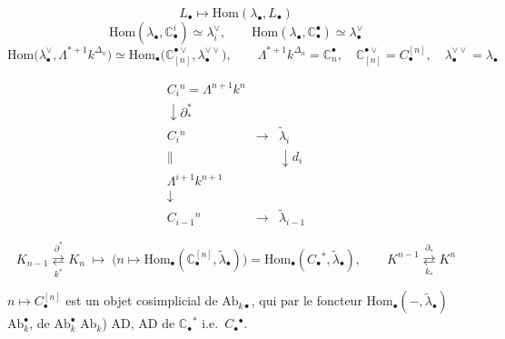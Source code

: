 \documentclass[11pt,a4paper]{article}
\begin{document}
\[
L_\bullet \longmapsto \mathrm{Hom}(\lambda_\bullet,L_\bullet)
\]
\[
\mathrm{Hom}(\lambda_\bullet,\mathbb{C}^i_\bullet) \simeq \lambda_i^\vee, \qquad
\mathrm{Hom}(\lambda_\bullet,\mathbb{C}^\bullet_\bullet) \simeq \lambda^\vee_\bullet
\]
\[
\mathrm{Hom}\bigl(\lambda^\vee_\bullet,\Lambda^{*+1}k^{\Delta_n}\bigr) \simeq \mathrm{Hom}_\bullet\bigl(\mathbb{C}^{\bullet\vee}_{[n]},\lambda^{\vee\vee}_\bullet\bigr),
\qquad \Lambda^{*+1}k^{\Delta_n} = \mathbb{C}^\bullet_n, \quad \mathbb{C}^{\bullet\vee}_{[n]} = C_\bullet^{[n]}, \quad \lambda^{\vee\vee}_\bullet = \lambda_\bullet
\]
\struck{\ill{}}   

\[
\begin{array}{ccc}
C_i{}^n = \Lambda^{n+1}k^n & & \\
\downarrow{\scriptstyle\partial^*_*} & & \\
C_i{}^n & \longrightarrow & \tilde\lambda_i \\
\| & & \downarrow{\scriptstyle d_i} \\
\Lambda^{i+1}k^{n+1} & & \\
\downarrow & & \\
C_{i-1}{}^n & \longrightarrow & \tilde\lambda_{i-1}
\end{array}
\]

 \quad {} \quad {}

\[
K_{n-1} \underset{k^*}{\overset{\partial^*}{\rightleftarrows}} K_n \;\longmapsto\;
\bigl(n\mapsto \mathrm{Hom}_\bullet(\mathbb{C}_\bullet^{[n]},\tilde\lambda_\bullet)\bigr) = \mathrm{Hom}_\bullet(C_\bullet{}^*,\tilde\lambda_\bullet),
\qquad
K^{n-1} \underset{k_*}{\overset{\partial_*}{\rightleftarrows}} K^n
\]

$n \mapsto C_\bullet^{[n]}$ est un objet cosimplicial de $\mathrm{Ab}_{k\bullet}$, qui  par le foncteur  $\mathrm{Hom}_\bullet(-,\tilde\lambda_\bullet)$  $\mathrm{Ab}_k^\bullet$,   de $\mathrm{Ab}^\bullet_k$  $\mathrm{Ab}_k$)  \ill{}  AD, \ill{}  \ill{}  \ill{}  AD  de $\mathbb{C}_\bullet{}^*$ i.e.\ $C_\bullet{}^\bullet$.
\end{document}
